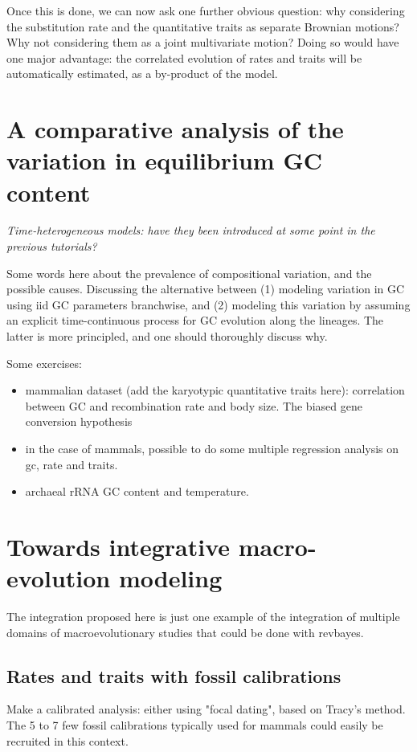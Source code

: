 \documentclass[usletter]{article}
\begin{document}
Once this is done, we can now ask one further obvious question: why considering the substitution rate and the quantitative traits as separate Brownian motions? Why not considering them as a joint multivariate motion? Doing so would have one major advantage: the correlated evolution of rates and traits will be automatically estimated, as a by-product of the model.

\section{A comparative analysis of the variation in equilibrium GC content}

\emph{Time-heterogeneous models: have they been introduced at some point in the previous tutorials?}

Some words here about the prevalence of compositional variation, and the possible causes. Discussing the alternative between (1) modeling variation in GC using iid GC parameters branchwise, and (2) modeling this variation by assuming an explicit time-continuous process for GC evolution along the lineages. The latter is more principled, and one should thoroughly discuss why.

Some exercises: 
\begin{itemize}
\item
mammalian dataset (add the karyotypic quantitative traits here): correlation between GC and recombination rate and body size. The biased gene conversion hypothesis
\item
in the case of mammals, possible to do some multiple regression analysis on gc, rate and traits.
\item
archaeal rRNA GC content and temperature.
\end{itemize}

\section{Towards integrative macro-evolution modeling}

The integration proposed here is just one example of the integration of multiple domains of macroevolutionary studies that could be done with revbayes.

\subsection{Rates and traits with fossil calibrations}

Make a calibrated analysis: either using "focal dating", based on Tracy's method. The 5 to 7 few fossil calibrations typically used for mammals could easily be recruited in this context.
\end{document}
